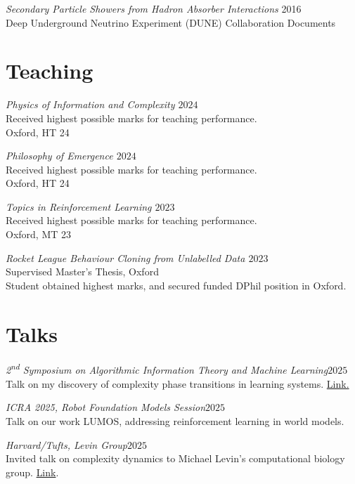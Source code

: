 \documentclass[margin]{res}
\begin{document}
\begin{resume}
                {\sl Secondary Particle Showers from Hadron Absorber Interactions} \hfill 2016 \\
                Deep Underground Neutrino Experiment (DUNE) Collaboration Documents


                \section{Teaching}
                        {\sl Physics of Information and Complexity \hfill $2024$}\\
                        Received highest possible marks for teaching performance.\\
                Oxford, HT 24

                {\sl Philosophy of Emergence \hfill $2024$}\\
                Received highest possible marks for teaching performance.\\
                Oxford, HT 24

                {\sl Topics in Reinforcement Learning \hfill $2023$}\\
                Received highest possible marks for teaching performance.\\
                Oxford, MT 23

                {\sl Rocket League Behaviour Cloning from Unlabelled Data \hfill $2023$}\\
                Supervised Master's Thesis, Oxford\\
                Student obtained highest marks, and secured funded DPhil position in Oxford.

                \section{Talks}
                {\sl 2\textsuperscript{nd} Symposium on Algorithmic Information Theory and Machine Learning\hfill $2025$}\\
                Talk on my discovery of complexity phase transitions in learning systems. \href{https://www.youtube.com/watch?v=6QjSH9ghUJs}{Link.}

                {\sl ICRA 2025, Robot Foundation Models Session\hfill $2025$}\\
                Talk on our work LUMOS, addressing reinforcement learning in world models.

                {\sl Harvard/Tufts, Levin Group\hfill $2025$}\\
                Invited talk on complexity dynamics to Michael Levin's computational biology group. \href{https://www.youtube.com/watch?v=gb0z8lV1i78}{Link}.


\end{resume}
\end{document}
